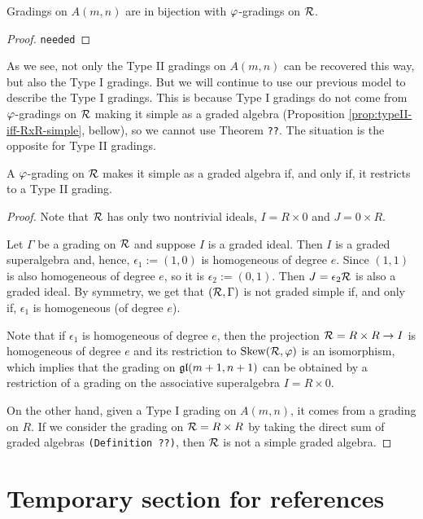 \documentclass{amsbook}
\begin{document}
\begin{prop}
    Gradings on $A(m,n)$ are in bijection with $\varphi$-gradings on $\mathcal R$.
\end{prop}

\begin{proof}
    {\tt needed}
\end{proof}

As we see, not only the Type II gradings on $A(m,n)$ can be recovered this way, but also the Type I gradings. But we will continue to use our previous model to describe the Type I gradings. This is because Type I gradings do not come from $\varphi$-gradings on $\mathcal R$ making it simple as a graded algebra (Proposition \ref{prop:typeII-iff-RxR-simple}, bellow), so we cannot use Theorem {\tt ??}. The situation is the opposite for Type II gradings.

\begin{prop}\label{prop:typeII-iff-RxR-simple}
    A $\varphi$-grading on $\mathcal R$ makes it simple as a graded algebra if, and only if, it restricts to a Type II grading.
\end{prop}

\begin{proof}
    Note that $\mathcal R$ has only two nontrivial ideals, $I = R\times 0$ and $J = 0\times R$.
    
    Let $\Gamma$ be a grading on $\mathcal R$ and suppose $I$ is a graded ideal. Then $I$ is a graded superalgebra and, hence, $\epsilon_1 := (1,0)$ is homogeneous of degree $e$. Since $(1,1)$ is also homogeneous of degree $e$, so it is $\epsilon_2:= (0,1)$. Then $J = \epsilon_2 \mathcal R$ is also a graded ideal. By symmetry, we get that $(\mathcal R, \Gamma)$ is not graded simple if, and only if, $\epsilon_1$ is homogeneous (of degree $e$).
    
    Note that if $\epsilon_1$ is homogeneous of degree $e$, then the projection $\mathcal R = R\times R \to I$ is homogeneous of degree $e$ and its restriction to $\operatorname{Skew}(\mathcal R, \varphi)$ is an isomorphism, which implies that the grading on $\mathfrak{gl}(m +1, n+1)$ can be obtained by a restriction of a grading on the associative superalgebra $I = R\times 0$.
    
    On the other hand, given a Type I grading on $A(m,n)$, it comes from a grading on $R$. If we consider the grading on $\mathcal R = R\times R$ by taking the direct sum of graded algebras {\tt (Definition ??)}, then $\mathcal R$ is not a simple graded algebra.
\end{proof}

\section{Temporary section for references}
\end{document}
